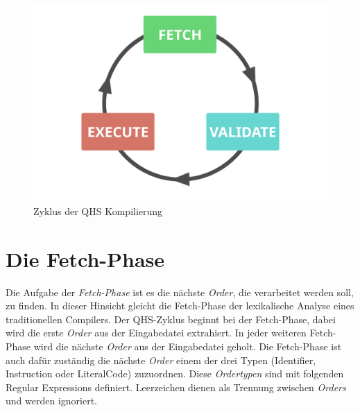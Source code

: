 \begin{figure}[h!]
    \centering
    \includegraphics[scale=0.6]{resources/images/qhs-cycle.png}
    \caption{Zyklus der QHS Kompilierung}
    \label{fig:qhs-cycle}
\end{figure}

\section{Die Fetch-Phase} \label{sec:qhs-fetch}
Die Aufgabe der \textit{Fetch-Phase} ist es die nächste \textit{Order}, die verarbeitet werden soll, zu finden. In dieser Hinsicht gleicht die Fetch-Phase der lexikalische Analyse eines traditionellen Compilers.
Der QHS-Zyklus beginnt bei der Fetch-Phase, dabei wird die erste \textit{Order} aus der Eingabedatei extrahiert. In jeder weiteren Fetch-Phase wird die nächste \textit{Order} aus der Eingabedatei geholt.
Die Fetch-Phase ist auch dafür zuständig die nächste \textit{Order} einem der drei Typen (Identifier, Instruction oder LiteralCode) zuzuordnen.
Diese \textit{Ordertypen} sind mit folgenden Regular Expressions definiert. Leerzeichen dienen als Trennung zwischen \textit{Orders} und werden ignoriert.

